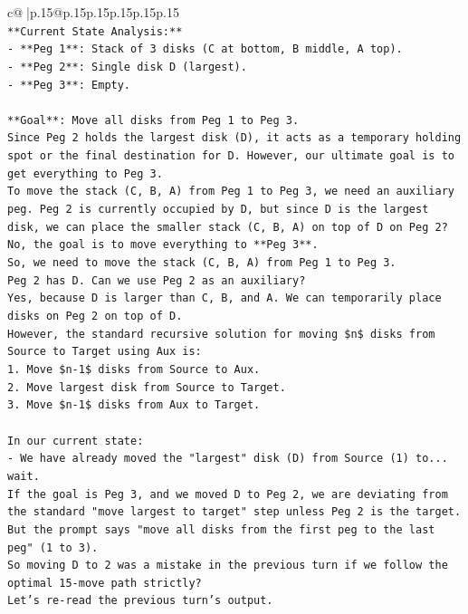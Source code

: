 \documentclass{article}
\begin{document}
{\begin{supertabular}{c@{$\;$}|p{.15\linewidth}@{}p{.15\linewidth}p{.15\linewidth}p{.15\linewidth}p{.15\linewidth}p{.15\linewidth}}
{{{\\ 
\texttt{**Current State Analysis:**} \\
\texttt{{-} **Peg 1**: Stack of 3 disks (C at bottom, B middle, A top).} \\
\texttt{{-} **Peg 2**: Single disk D (largest).} \\
\texttt{{-} **Peg 3**: Empty.} \\
\\ 
\texttt{**Goal**: Move all disks from Peg 1 to Peg 3.} \\
\texttt{Since Peg 2 holds the largest disk (D), it acts as a temporary holding spot or the final destination for D. However, our ultimate goal is to get everything to Peg 3.} \\
\texttt{To move the stack (C, B, A) from Peg 1 to Peg 3, we need an auxiliary peg. Peg 2 is currently occupied by D, but since D is the largest disk, we can place the smaller stack (C, B, A) on top of D on Peg 2?} \\
\texttt{No, the goal is to move everything to **Peg 3**.} \\
\texttt{So, we need to move the stack (C, B, A) from Peg 1 to Peg 3.} \\
\texttt{Peg 2 has D. Can we use Peg 2 as an auxiliary?} \\
\texttt{Yes, because D is larger than C, B, and A. We can temporarily place disks on Peg 2 on top of D.} \\
\texttt{However, the standard recursive solution for moving \$n\$ disks from Source to Target using Aux is:} \\
\texttt{1. Move \$n{-}1\$ disks from Source to Aux.} \\
\texttt{2. Move largest disk from Source to Target.} \\
\texttt{3. Move \$n{-}1\$ disks from Aux to Target.} \\
\\ 
\texttt{In our current state:} \\
\texttt{{-} We have already moved the "largest" disk (D) from Source (1) to... wait.} \\
\texttt{If the goal is Peg 3, and we moved D to Peg 2, we are deviating from the standard "move largest to target" step unless Peg 2 is the target. But the prompt says "move all disks from the first peg to the last peg" (1 to 3).} \\
\texttt{So moving D to 2 was a mistake in the previous turn if we follow the optimal 15{-}move path strictly?} \\
\texttt{Let's re{-}read the previous turn's output.} \\
}}}
\end{supertabular}}
\end{document}
